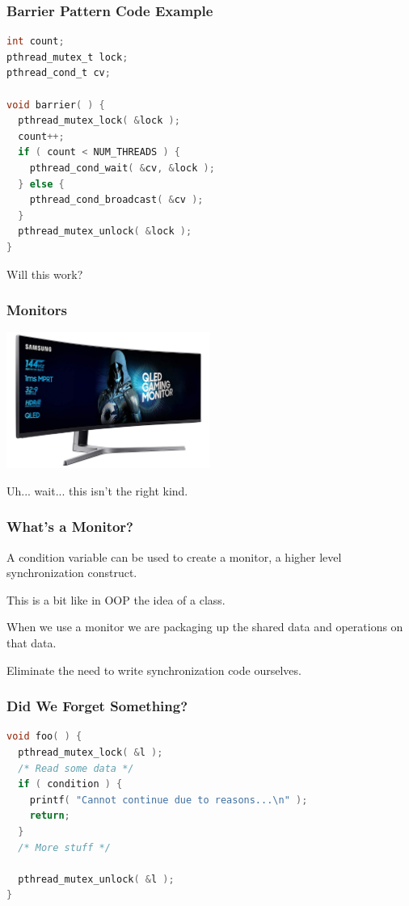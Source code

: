 \begin{frame}[fragile]
\frametitle{Barrier Pattern Code Example}
\begin{lstlisting}[language=C]
int count;
pthread_mutex_t lock;
pthread_cond_t cv; 

void barrier( ) {
  pthread_mutex_lock( &lock );
  count++;
  if ( count < NUM_THREADS ) {
    pthread_cond_wait( &cv, &lock );
  } else {
    pthread_cond_broadcast( &cv );
  }
  pthread_mutex_unlock( &lock );
}
\end{lstlisting}

Will this work?

\end{frame}


\begin{frame}
\frametitle{Monitors}
\begin{center}
	\includegraphics[width=0.5\textwidth]{images/monitor.jpg}
\end{center}

Uh... wait... this isn't the right kind.

\end{frame}

\begin{frame}
\frametitle{What's a Monitor?}

A condition variable can be used to create a \alert{monitor}, a higher level synchronization construct. 

This is a bit like in OOP the idea of a class.

When we use a monitor we are packaging up the shared data and operations on that data.

Eliminate the need to write synchronization code ourselves.

\end{frame}


\begin{frame}[fragile]
\frametitle{Did We Forget Something?}

\begin{lstlisting}[language=C]
void foo( ) {
  pthread_mutex_lock( &l );
  /* Read some data */
  if ( condition ) {
    printf( "Cannot continue due to reasons...\n" );
    return;
  }
  /* More stuff */
   
  pthread_mutex_unlock( &l );
}
\end{lstlisting}

\end{frame}


